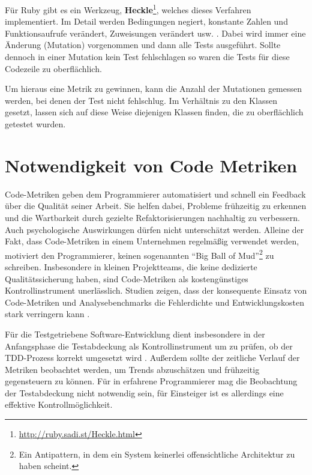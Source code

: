  Für Ruby gibt es ein Werkzeug, \textbf{Heckle}\footnote{\url{http://ruby.sadi.st/Heckle.html}}, welches dieses Verfahren implementiert. Im Detail werden Bedingungen negiert, konstante Zahlen und Funktionsaufrufe verändert, Zuweisungen verändert usw. \citep{ruby_sadists_confessions_2010}. Dabei wird immer eine Änderung (Mutation) vorgenommen und dann alle Tests ausgeführt. Sollte dennoch in einer Mutation kein Test fehlschlagen so waren die Tests für diese Codezeile zu oberflächlich.

 Um hieraus eine Metrik zu gewinnen, kann die Anzahl der Mutationen gemessen werden, bei denen der Test nicht fehlschlug. Im Verhältnis zu den Klassen gesetzt, lassen sich auf diese Weise diejenigen Klassen finden, die zu oberflächlich getestet wurden.
 \section{Notwendigkeit von Code Metriken}

 Code-Metriken geben dem Programmierer automatisiert und schnell ein Feedback über die Qualität seiner Arbeit. Sie helfen dabei, Probleme frühzeitig zu erkennen und die Wartbarkeit durch gezielte Refaktorisierungen nachhaltig zu verbessern. Auch psychologische Auswirkungen dürfen nicht unterschätzt werden. Alleine der Fakt, dass Code-Metriken in einem Unternehmen regelmäßig verwendet werden, motiviert den Programmierer, keinen sogenannten "`Big Ball of Mud"'\footnote{Ein Antipattern, in dem ein System keinerlei offensichtliche Architektur zu haben scheint.} zu schreiben. Insbesondere in kleinen Projektteams, die keine dedizierte Qualitätssicherung haben, sind Code-Metriken als kostengünstiges Kontrollinstrument unerlässlich. Studien zeigen, dass der konsequente Einsatz von Code-Metriken und Analysebenchmarks die Fehlerdichte und Entwicklungskosten stark verringern kann \citep[S.10f]{baggen_standardized_2011}.

 Für die Testgetriebene Software-Entwicklung dient insbesondere in der Anfangsphase die Testabdeckung als Kontrollinstrument um zu prüfen, ob der TDD-Prozess korrekt umgesetzt wird \citep[S. 300]{nagappan_realizing_2008}. Außerdem sollte der zeitliche Verlauf der Metriken beobachtet werden, um Trends abzuschätzen und frühzeitig gegensteuern zu können. Für in  erfahrene Programmierer mag die Beobachtung der Testabdeckung nicht notwendig sein, für Einsteiger ist es allerdings eine effektive Kontrollmöglichkeit.

